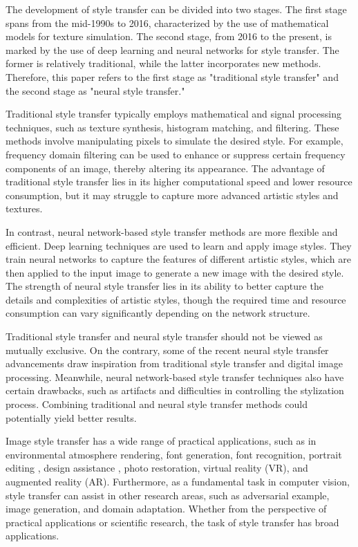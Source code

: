 \documentclass[preprint,12pt]{elsarticle}
\begin{document}
The development of style transfer can be divided into two stages. The first stage spans from the mid-1990s\citep{01jing2019neural} to 2016\citep{02gatys2016image}, characterized by the use of mathematical models for texture simulation. The second stage, from 2016\citep{02gatys2016image} to the present, is marked by the use of deep learning and neural networks for style transfer. The former is relatively traditional, while the latter incorporates new methods. Therefore, this paper refers to the first stage as "traditional style transfer" and the second stage as "neural style transfer."

Traditional style transfer typically employs mathematical and signal processing techniques, such as texture synthesis, histogram matching, and filtering. These methods involve manipulating pixels to simulate the desired style. For example, frequency domain filtering can be used to enhance or suppress certain frequency components of an image, thereby altering its appearance. The advantage of traditional style transfer lies in its higher computational speed and lower resource consumption, but it may struggle to capture more advanced artistic styles and textures.

In contrast, neural network-based style transfer methods are more flexible and efficient. Deep learning techniques are used to learn and apply image styles. They train neural networks to capture the features of different artistic styles, which are then applied to the input image to generate a new image with the desired style. The strength of neural style transfer lies in its ability to better capture the details and complexities of artistic styles, though the required time and resource consumption can vary significantly depending on the network structure.

Traditional style transfer and neural style transfer should not be viewed as mutually exclusive. On the contrary, some of the recent neural style transfer advancements\citep{03li2023frequency,04huang2017arbitrary} draw inspiration from traditional style transfer and digital image processing. Meanwhile, neural network-based style transfer techniques also have certain drawbacks, such as artifacts and difficulties in controlling the stylization process. Combining traditional and neural style transfer methods could potentially yield better results.

Image style transfer has a wide range of practical applications, such as in environmental atmosphere rendering\citep{05ke2023neural}, font generation\citep{06fu2023neural}, font recognition\citep{07tang2022few}, portrait editing \citep{08liu2021psgan++,09xu2022transeditor}, design assistance \citep{10liu2021self,11bae2023unsupervised,12hollein2022stylemesh,13yin20213dstylenet,14yang2022industrial}, photo restoration\citep{15gunawan2023modernizing}, virtual reality (VR), and augmented reality (AR)\citep{16mu20223d}.
Furthermore, as a fundamental task in computer vision, style transfer can assist in other research areas, such as adversarial example\citep{17naseer2022stylized,18cao2023stylefool}, image generation\citep{19karras2019style}, and domain adaptation\citep{20guan2022cdtnet}. Whether from the perspective of practical applications or scientific research, the task of style transfer has broad applications.
\end{document}
